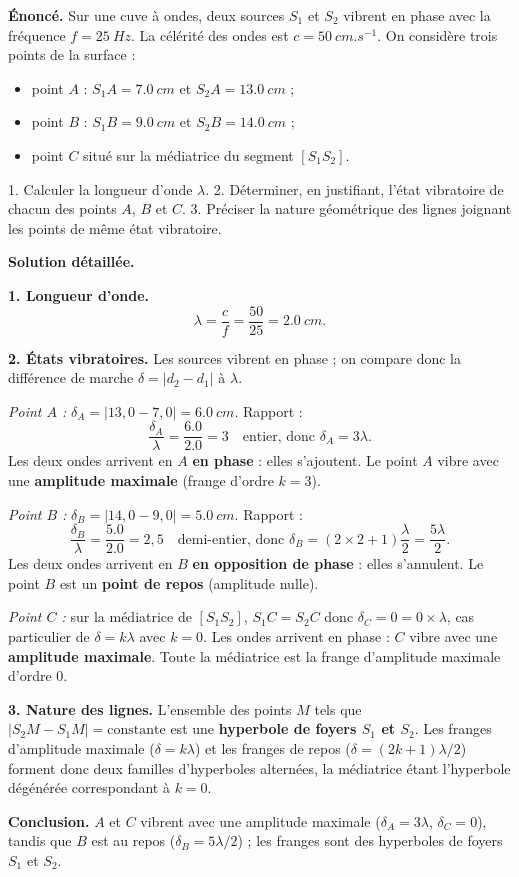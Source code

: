 \documentclass[11pt]{article}
\begin{document}
\begin{exoresolu}
\textbf{Énoncé.} Sur une cuve à ondes, deux sources $S_1$ et $S_2$ vibrent en phase avec la fréquence $f = \SI{25}{Hz}$. La célérité des ondes est $c = \SI{50}{cm.s^{-1}}$. On considère trois points de la surface :
\begin{itemize}
\item point $A$ : $S_1A = \SI{7,0}{cm}$ et $S_2A = \SI{13,0}{cm}$ ;
\item point $B$ : $S_1B = \SI{9,0}{cm}$ et $S_2B = \SI{14,0}{cm}$ ;
\item point $C$ situé sur la médiatrice du segment $[S_1S_2]$.
\end{itemize}
1. Calculer la longueur d'onde $\lambda$.
2. Déterminer, en justifiant, l'état vibratoire de chacun des points $A$, $B$ et $C$.
3. Préciser la nature géométrique des lignes joignant les points de même état vibratoire.

\tcblower
\textbf{Solution détaillée.}

\textbf{1. Longueur d'onde.}
\[ \lambda = \frac{c}{f} = \frac{50}{25} = \SI{2,0}{cm}. \]

\textbf{2. États vibratoires.} Les sources vibrent en phase ; on compare donc la différence de marche $\delta = |d_2 - d_1|$ à $\lambda$.

\emph{Point $A$ :} $\delta_A = |13,0 - 7,0| = \SI{6,0}{cm}$. Rapport :
\[ \frac{\delta_A}{\lambda} = \frac{\num{6,0}}{\num{2,0}} = 3 \quad \text{entier, donc } \delta_A = 3\lambda. \]
Les deux ondes arrivent en $A$ \textbf{en phase} : elles s'ajoutent. Le point $A$ vibre avec une \textbf{amplitude maximale} (frange d'ordre $k = 3$).

\emph{Point $B$ :} $\delta_B = |14,0 - 9,0| = \SI{5,0}{cm}$. Rapport :
\[ \frac{\delta_B}{\lambda} = \frac{\num{5,0}}{\num{2,0}} = 2,5 \quad \text{demi-entier, donc } \delta_B = (2\times 2 + 1)\frac{\lambda}{2} = \frac{5\lambda}{2}. \]
Les deux ondes arrivent en $B$ \textbf{en opposition de phase} : elles s'annulent. Le point $B$ est un \textbf{point de repos} (amplitude nulle).

\emph{Point $C$ :} sur la médiatrice de $[S_1S_2]$, $S_1C = S_2C$ donc $\delta_C = 0 = 0\times\lambda$, cas particulier de $\delta = k\lambda$ avec $k = 0$. Les ondes arrivent en phase : $C$ vibre avec une \textbf{amplitude maximale}. Toute la médiatrice est la frange d'amplitude maximale d'ordre $0$.

\textbf{3. Nature des lignes.} L'ensemble des points $M$ tels que $|S_2M - S_1M| = \text{constante}$ est une \textbf{hyperbole de foyers $S_1$ et $S_2$}. Les franges d'amplitude maximale ($\delta = k\lambda$) et les franges de repos ($\delta = (2k+1)\lambda/2$) forment donc deux familles d'hyperboles alternées, la médiatrice étant l'hyperbole dégénérée correspondant à $k = 0$.

\textbf{Conclusion.} $A$ et $C$ vibrent avec une amplitude maximale ($\delta_A = 3\lambda$, $\delta_C = 0$), tandis que $B$ est au repos ($\delta_B = 5\lambda/2$) ; les franges sont des hyperboles de foyers $S_1$ et $S_2$.
\end{exoresolu}
\end{document}
